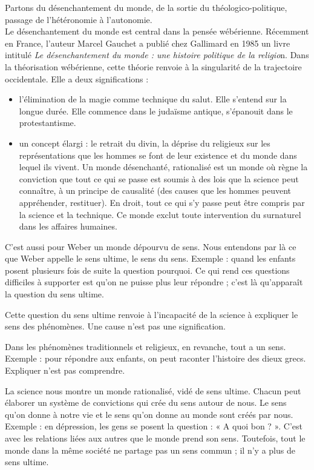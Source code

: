 \documentclass[a4paper,11pt]{article}
\begin{document}
	Partons du désenchantement du monde, de la sortie du théologico-politique, passage de l’hétéronomie à l’autonomie.\\

	Le désenchantement du monde est central dans la pensée wébérienne.
	Récemment en France, l’auteur Marcel Gauchet a publié chez Gallimard en 1985 un livre intitulé \textit{Le désenchantement du monde : une histoire politique de la religio}n. Dans la théorisation wébérienne, cette théorie renvoie à la singularité de la trajectoire occidentale. 
	Elle a deux significations :
	\begin{itemize}
	\item l’élimination de la magie comme technique du salut.
		Elle s’entend sur la longue durée. 
		Elle commence dans le judaïsme antique, s’épanouit dans le protestantisme.
	\item un concept élargi : le retrait du divin, la déprise du religieux sur les représentations que les hommes se font de leur existence et du monde dans lequel ils vivent.
		Un monde désenchanté, rationalisé est un monde où règne la conviction que tout ce qui se passe est soumis à des lois que la science peut connaître, à un principe de causalité (des causes que les hommes peuvent appréhender, restituer).
		En droit, tout ce qui s’y passe peut être compris par la science et la technique. Ce monde exclut toute intervention du surnaturel dans les affaires humaines.
	\end{itemize}
	
	
	C’est aussi pour Weber un monde dépourvu de sens. Nous entendons par là ce que Weber appelle le sens ultime, le sens du sens. Exemple : quand les enfants posent plusieurs fois de suite la question pourquoi. Ce qui rend ces questions difficiles à supporter est qu’on ne puisse plus leur répondre ; c’est là qu’apparaît la question du sens ultime.
	
	Cette question du sens ultime renvoie à l’incapacité de la science à expliquer le sens des phénomènes. Une cause n’est pas une signification.
	
	Dans les phénomènes traditionnels et religieux, en revanche, tout a un sens. 
	Exemple : pour répondre aux enfants, on peut raconter l’histoire des dieux grecs. 			Expliquer n’est pas comprendre.
	
	La science nous montre un monde rationalisé, vidé de sens ultime. Chacun peut élaborer un système de convictions qui crée du sens autour de nous. Le sens qu’on donne à notre vie et le sens qu’on donne au monde sont créés par nous.
	Exemple : en dépression, les gens se posent la question : « A quoi bon ? ».
	C’est avec les relations liées aux autres que le monde prend son sens. Toutefois, tout le monde dans la même société ne partage pas un sens commun ; il n’y a plus de sens ultime.
	
\end{document}
